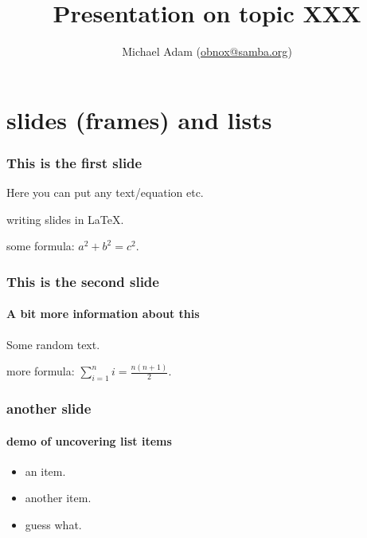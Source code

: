 \documentclass[10pt]{beamer}
\title{Presentation on  topic XXX}
\author{Michael Adam (\href{mailto:obnox@samba.org}{obnox@samba.org})}
\begin{document}
    \maketitle



    \section{slides (frames) and lists}


    \begin{frame}
	    \frametitle{This is the first slide}
		Here you can put any text/equation etc. 

        writing slides in \LaTeX.

        some formula: $a^2 + b^2 = c^2$.


    \end{frame}
	\begin{frame}
		\frametitle{This is the second slide}
		\framesubtitle{A bit more information about this}
		Some random text.

        more formula: $\sum_{i=1}^{n}i = \frac{n(n+1)}{2}$.

    \end{frame}
    \begin{frame}
        \frametitle{another slide}
        \framesubtitle{demo of uncovering list items}
        \begin{itemize}
          \item<2-> an item.
          \item<3-> another item.
          \item<4-> guess what.
        \end{itemize}
    \end{frame}
\end{document}
